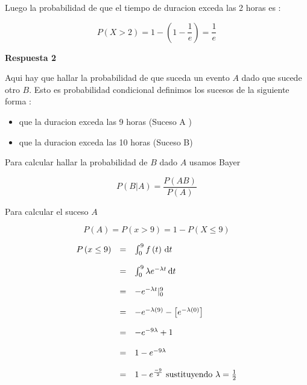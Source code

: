 \documentclass{article}
\begin{document}
    Luego la probabilidad de que el tiempo de duracion exceda las 2 horas es : 

    \begin{equation*}
        P \left(X > 2 \right) = 1 - \left(1 - \frac{1}{e}\right)  = \frac{1}{e} 
    \end{equation*}


    {\bf Respuesta 2 } 

    Aqui hay que hallar la probabilidad de que suceda un evento $A$ dado que sucede otro $B$.
    Esto es probabilidad condicional definimos los sucesos de la siguiente forma :

    \begin{itemize}
        \item que la duracion exceda las 9 horas (Suceso A )
        \item que la duracion exceda las 10 horas (Suceso B)
    \end{itemize}
    
    Para calcular hallar la probabilidad de $B$ dado $A$ usamos Bayer
    
    \begin{equation*}
        P \left(B | A  \right) = \frac{P \left(AB\right)}{P\left(A\right)}
    \end{equation*}

    Para calcular el suceso $A$ 

    \begin{equation*}
        P\left(A \right) = P \left(x > 9 \right) = 1 - P \left(X \le 9 \right)
    \end{equation*}

    \begin{equation*}
        \begin{array}{rcl}
            P \left(x \le 9 \right) &  =  & \int_{0}^{9} f\left(t\right) \,\mathrm{d}t 
            \\
            \\
                                    &  =  & \int_{0}^{9} \lambda e^{- \lambda t}  \,\mathrm{d}t 
            \\
            \\
                                    &  =  & - e ^{-\lambda t } |_{0}^{9} 
            \\
            \\
                                    & = & -e^{- \lambda \left(9\right)} - \left[e^{-  \lambda \left(0\right) }\right]
            \\
            \\
                                    & = & -e^{-9 \lambda} + 1   
            \\
            \\
                                    & = & 1 - e^{-9 \lambda}   
            \\
            \\
                                    & = & 1 - e^{\frac{-9}{2}}  \mbox{ sustituyendo  $ \lambda = \frac{1}{2}$}
        \end{array}
    \end{equation*}
\end{document}
